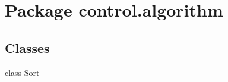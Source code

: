 \hypertarget{namespacecontrol_1_1algorithm}{}\section{Package control.\+algorithm}
\label{namespacecontrol_1_1algorithm}
\subsection*{Classes}
\begin{DoxyCompactItemize}
\item 
class \mbox{\hyperlink{classcontrol_1_1algorithm_1_1_sort}{Sort}}
\end{DoxyCompactItemize}
